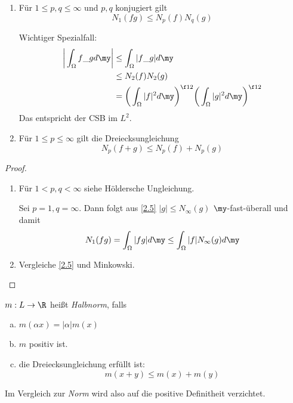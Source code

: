 \documentclass{mycourse}
\begin{document}
\begin{kor} \label{2.8}
	\begin{enumerate}[1)]
		\item
			Für $1 \le p,q \le \infty$ und $p,q$ konjugiert gilt
			\[
				N_1(fg) \le N_p(f) N_q(g)
			\]
			\begin{note}
				Wichtiger Spezialfall:
				\begin{align*}
					\bigg| \int_{\Omega} f \_g d\my \bigg|
					&\le \int_{\Omega} |f \_g| d\my \\
					&\le N_2(f) N_2(g) \\
					&= \bigg( \int_{\Omega} |f|^2 d\my \bigg)^{\f 12} \bigg( \int_{\Omega} |g|^2 d\my \bigg)^{\f 12}
				\end{align*}
				Das entspricht der CSB im $L^2$.
			\end{note}
		\item
			Für $1 \le p \le \infty$ gilt die Dreiecksungleichung
			\[
				N_p(f+g) \le N_p(f) + N_p(g)
			\]
	\end{enumerate}
	\begin{proof}
		\begin{enumerate}[1)]
			\item
				Für $1 < p,q < \infty$ siehe Höldersche Ungleichung.

				Sei $p=1, q = \infty$.
				Dann folgt aus \ref{2.5} $|g| \le N_\infty(g)$ $\my$-fast-überall und damit
				\[
					N_1(fg) = \int_{\Omega} |fg| d\my \le \int_{\Omega}|f| N_\infty (g) d\my
				\]
			\item
				Vergleiche \ref{2.5} und Minkowski.
		\end{enumerate}
	\end{proof}
\end{kor}

\begin{df*} 
	$m : L \to \R$ heißt \emph{Halbnorm}, falls
	\begin{enumerate}[a)]
		\item
			$\displaystyle m(\alpha x) = |\alpha| m(x)$
		\item
			$m$ positiv ist.
		\item
			die Dreiecksungleichung erfüllt ist:
			\[
				m(x+y) \le m(x) + m(y)
			\]
	\end{enumerate}
	\begin{note}
		Im Vergleich zur \emph{Norm} wird also auf die positive Definitheit verzichtet.
	\end{note}
\end{df*}
\end{document}
